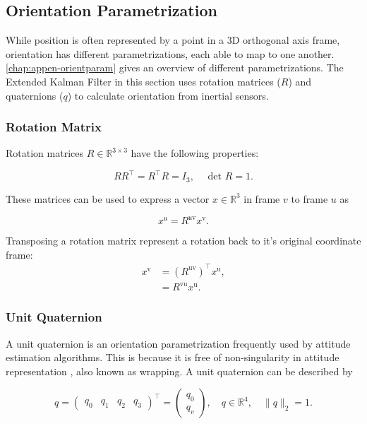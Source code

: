 \subsection{Orientation Parametrization}
While position is often represented by a point in a 3D orthogonal axis frame, orientation has different parametrizations, each able to map to one another. \cref{chap:appen-orientparam} gives an overview of different parametrizations. The Extended Kalman Filter in this section uses rotation matrices ($R$) and quaternions ($q$) to calculate orientation from inertial sensors.

\subsubsection{Rotation Matrix}
Rotation matrices $R \in \mathbb{R}^{3 \times 3}$ have the following properties:

\begin{equation}
	\label{eq:rot_mat_properties}
	R R^{\top}=R^{\top} R=I_{3}, \quad \text { det } R=1.
\end{equation}

These matrices can be used to express a vector $x \in \mathbb{R}^{3}$ in frame $v$ to frame $u$ as 

\begin{equation}
	\label{eq:rot_mat_rot_x}
	x^{\mathfrak{u}}=R^{\mathfrak{u} \mathrm{v}} x^{\mathrm{v}}.
\end{equation}

Transposing a rotation matrix represent a rotation back to it's original coordinate frame:
\begin{subequations}
	\begin{align}
		\label{eq:rot_mat_trans}
		x^{\mathrm{v}}&=\left(R^{\mathrm{uv}}\right)^{\top} x^{\mathrm{u}},\\
		&=R^{\mathrm{vu}} x^{\mathrm{u}}.
	\end{align}
\end{subequations}

\subsubsection{Unit Quaternion}
A unit quaternion is an orientation parametrization frequently used by attitude estimation algorithms. This is because it is free of non-singularity in attitude representation \cite{Hashim2019}, also known as wrapping. A unit quaternion can be described by

\begin{equation}
	\label{eq:unit_quarternion}
	q=\left(\begin{array}{llll}{q_{0}} & {q_{1}} & {q_{2}} & {q_{3}}\end{array}\right)^{\top}
	=\left(\begin{array}{l}{q_{0}} \\ {q_{v}}\end{array}\right), 
	\quad q \in \mathbb{R}^{4}, 
	\quad\|q\|_{2}=1.
\end{equation}

